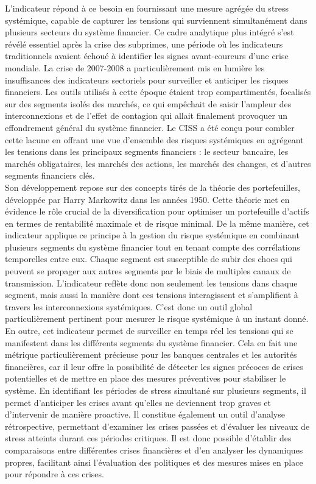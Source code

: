 L'indicateur répond à ce besoin en fournissant une mesure agrégée du stress systémique, capable de capturer les tensions qui surviennent simultanément dans plusieurs secteurs du système financier. Ce cadre analytique plus intégré s’est révélé essentiel après la crise des subprimes, une période où les indicateurs traditionnels avaient échoué à identifier les signes avant-coureurs d’une crise mondiale. La crise de 2007-2008 a particulièrement mis en lumière les insuffisances des indicateurs sectoriels pour surveiller et anticiper les risques financiers. Les outils utilisés à cette époque étaient trop compartimentés, focalisés sur des segments isolés des marchés, ce qui empêchait de saisir l'ampleur des interconnexions et de l’effet de contagion qui allait finalement provoquer un effondrement général du système financier. Le CISS a été conçu pour combler cette lacune en offrant une vue d’ensemble des risques systémiques en agrégeant les tensions dans les principaux segments financiers : le secteur bancaire, les marchés obligataires, les marchés des actions, les marchés des changes, et d’autres segments financiers clés.\\

Son développement repose sur des concepts tirés de la théorie des portefeuilles, développée par Harry Markowitz dans les années 1950. Cette théorie met en évidence le rôle crucial de la diversification pour optimiser un portefeuille d’actifs en termes de rentabilité maximale et de risque minimal. De la même manière, cet indicateur applique ce principe à la gestion du risque systémique en combinant plusieurs segments du système financier tout en tenant compte des corrélations temporelles entre eux. Chaque segment est susceptible de subir des chocs qui peuvent se propager aux autres segments par le biais de multiples canaux de transmission. L’indicateur reflète donc non seulement les tensions dans chaque segment, mais aussi la manière dont ces tensions interagissent et s’amplifient à travers les interconnexions systémiques. C'est donc un outil global particulièrement pertinent pour mesurer le risque systémique à un instant donné.\\

En outre, cet indicateur permet de surveiller en temps réel les tensions qui se manifestent dans les différents segments du système financier. Cela en fait une métrique particulièrement précieuse pour les banques centrales et les autorités financières, car il leur offre la possibilité de détecter les signes précoces de crises potentielles et de mettre en place des mesures préventives pour stabiliser le système. En identifiant les périodes de stress simultané sur plusieurs segments, il permet d’anticiper les crises avant qu’elles ne deviennent trop graves et d’intervenir de manière proactive. Il constitue également un outil d’analyse rétrospective, permettant d’examiner les crises passées et d’évaluer les niveaux de stress atteints durant ces périodes critiques. Il est donc possible d’établir des comparaisons entre différentes crises financières et d’en analyser les dynamiques propres, facilitant ainsi l’évaluation des politiques et des mesures mises en place pour répondre à ces crises.\\

